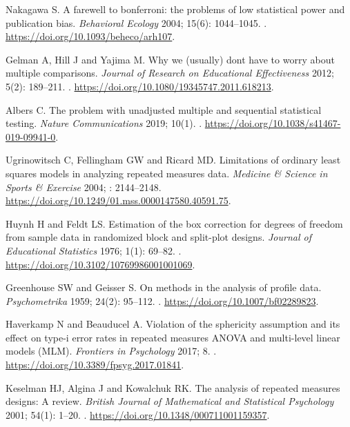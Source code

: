 \documentclass[Royal,times,doublespace,sagev]{sagej}
\begin{document}
\begin{thebibliography}{10}
Nakagawa S.
\newblock A farewell to bonferroni: the problems of low statistical power and
  publication bias.
\newblock \emph{Behavioral Ecology} 2004; 15(6): 1044--1045.
\newblock {}.
\newblock \urlprefix\url{https://doi.org/10.1093/beheco/arh107}.

Gelman A, Hill J and Yajima M.
\newblock Why we (usually) don{\textquotesingle}t have to worry about multiple
  comparisons.
\newblock \emph{Journal of Research on Educational Effectiveness} 2012; 5(2):
  189--211.
\newblock {}.
\newblock \urlprefix\url{https://doi.org/10.1080/19345747.2011.618213}.

Albers C.
\newblock The problem with unadjusted multiple and sequential statistical
  testing.
\newblock \emph{Nature Communications} 2019; 10(1).
\newblock {}.
\newblock \urlprefix\url{https://doi.org/10.1038/s41467-019-09941-0}.

Ugrinowitsch C, Fellingham GW and Ricard MD.
\newblock Limitations of ordinary least squares models in analyzing repeated
  measures data.
\newblock \emph{Medicine {\&} Science in Sports {\&} Exercise} 2004; :
  2144--2148.
\newblock \urlprefix\url{https://doi.org/10.1249/01.mss.0000147580.40591.75}.

Huynh H and Feldt LS.
\newblock Estimation of the box correction for degrees of freedom from sample
  data in randomized block and split-plot designs.
\newblock \emph{Journal of Educational Statistics} 1976; 1(1): 69--82.
\newblock {}.
\newblock \urlprefix\url{https://doi.org/10.3102/10769986001001069}.

Greenhouse SW and Geisser S.
\newblock On methods in the analysis of profile data.
\newblock \emph{Psychometrika} 1959; 24(2): 95--112.
\newblock {}.
\newblock \urlprefix\url{https://doi.org/10.1007/bf02289823}.

Haverkamp N and Beauducel A.
\newblock Violation of the sphericity assumption and its effect on type-i error
  rates in repeated measures {ANOVA} and multi-level linear models ({MLM}).
\newblock \emph{Frontiers in Psychology} 2017; 8.
\newblock {}.
\newblock \urlprefix\url{https://doi.org/10.3389/fpsyg.2017.01841}.

Keselman HJ, Algina J and Kowalchuk RK.
\newblock The analysis of repeated measures designs: A review.
\newblock \emph{British Journal of Mathematical and Statistical Psychology}
  2001; 54(1): 1--20.
\newblock {}.
\newblock \urlprefix\url{https://doi.org/10.1348/000711001159357}.


\end{thebibliography}
\end{document}
